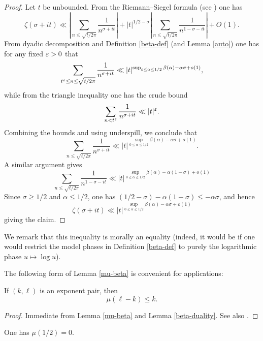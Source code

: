 \begin{proof}  Let $t$ be unbounded.  From the Riemann--Siegel formula (see \cite[Theorem 4.1]{ivic}) one has
    $$ \zeta(\sigma+it) \ll \left|\sum_{n \leq \sqrt{t/2\pi}} \frac{1}{n^{\sigma+it}}\right| + |t|^{1/2-\sigma} \left|\sum_{n \leq \sqrt{t/2\pi}} \frac{1}{n^{1-\sigma-it}}\right| + O(1).$$
From dyadic decomposition and Definition \ref{beta-def} (and Lemma \ref{auto}) one has for any fixed $\varepsilon>0$ that
$$\sum_{t^\varepsilon \leq n \leq \sqrt{t/2\pi}} \frac{1}{n^{\sigma+it}} \ll
|t|^{\sup_{\varepsilon \leq \alpha \leq 1/2} \beta(\alpha) - \alpha \sigma + o(1)},$$
while from the triangle inequality one has the crude bound
$$\sum_{n < t^\varepsilon} \frac{1}{n^{\sigma+it}} \ll |t|^\varepsilon.$$
Combining the bounds and using underspill, we conclude that
$$\sum_{n \leq \sqrt{t/2\pi}} \frac{1}{n^{\sigma+it}} \ll
|t|^{\sup_{0 \leq \alpha \leq 1/2} \beta(\alpha) - \alpha \sigma + o(1)}.$$
A similar argument gives
$$\sum_{n \leq \sqrt{t/2\pi}} \frac{1}{n^{1-\sigma-it}} \ll
|t|^{\sup_{0 \leq \alpha \leq 1/2} \beta(\alpha) - \alpha (1-\sigma) + o(1)}$$
Since $\sigma \geq 1/2$ and $\alpha \leq 1/2$, one has $(1/2-\sigma) - \alpha(1-\sigma) \leq -\alpha \sigma$, and hence
$$ \zeta(\sigma+it) \ll
|t|^{\sup_{0 \leq \alpha \leq 1/2} \beta(\alpha) - \alpha \sigma + o(1)}$$
giving the claim.
\end{proof}

We remark that this inequality is morally an equality (indeed, it would be if one would restrict the model phases in Definition \ref{beta-def} to purely the logarithmic phase $u \mapsto \log u$).

The following form of Lemma \ref{mu-beta} is convenient for applications:

\begin{corollary}\label{exp-pair-mu} If $(k,\ell)$ is an exponent pair, then
$$ \mu(\ell-k) \leq k.$$
\end{corollary}


\begin{proof}  Immediate from Lemma \ref{mu-beta} and Lemma \ref{beta-duality}.  See also \cite[(7.57)]{ivic}.
\end{proof}

\begin{conjecture}\label{LH} One has $\mu(1/2)=0$.
\end{conjecture}

